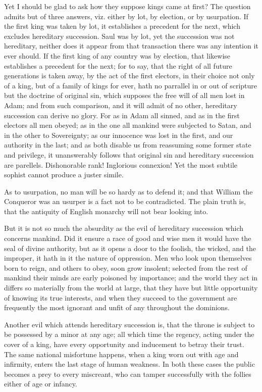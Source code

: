 \documentclass[12pt,oneside]{memoir}
\begin{document}
Yet I should be glad to ask how they suppose kings came at first?
The question admits but of three answers, viz. either by lot, by
election, or by usurpation. If the first king was taken by lot, it
establishes a precedent for the next, which excludes hereditary
succession. Saul was by lot, yet the succession was not hereditary,
neither does it appear from that transaction there was any intention
it ever should. If the first king of any country was by election,
that likewise establishes a precedent for the next; for to say, that
the right of all future generations is taken away, by the act of the
first electors, in their choice not only of a king, but of a family
of kings for ever, hath no parrallel in or out of scripture but the
doctrine of original sin, which supposes the free will of all men
lost in Adam; and from such comparison, and it will admit of no
other, hereditary succession can derive no glory. For as in Adam all
sinned, and as in the first electors all men obeyed; as in the one
all mankind were subjected to Satan, and in the other to Sovereignty;
as our innocence was lost in the first, and our authority in the
last; and as both disable us from reassuming some former state and
privilege, it unanswerably follows that original sin and hereditary
succession are parellels. Dishonorable rank! Inglorious connexion!
Yet the most subtile sophist cannot produce a juster simile.

As to usurpation, no man will be so hardy as to defend it; and that
William the Conqueror was an usurper is a fact not to be
contradicted. The plain truth is, that the antiquity of English
monarchy will not bear looking into.

But it is not so much the absurdity as the evil of hereditary
succession which concerns mankind. Did it ensure a race of good and
wise men it would have the seal of divine authority, but as it opens
a door to the foolish, the wicked, and the improper, it hath in it
the nature of oppression. Men who look upon themselves born to reign,
and others to obey, soon grow insolent; selected from the rest of
mankind their minds are early poisoned by importance; and the world
they act in differs so materially from the world at large, that they
have but little opportunity of knowing its true interests, and when
they succeed to the government are frequently the most ignorant and
unfit of any throughout the dominions.

Another evil which attends hereditary succession is, that the throne
is subject to be possessed by a minor at any age; all which time the
regency, acting under the cover of a king, have every opportunity
and inducement to betray their trust. The same national misfortune
happens, when a king worn out with age and infirmity, enters the
last stage of human weakness. In both these cases the public becomes
a prey to every miscreant, who can tamper successfully with the
follies either of age or infancy.
\end{document}
